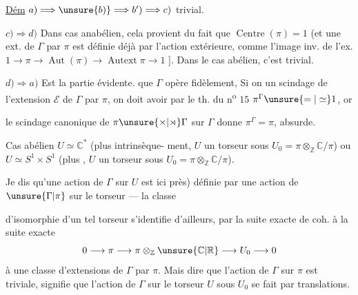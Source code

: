 \uline{Dém} $a)\Longrightarrow\unsure{b)}\Longrightarrow b')\Longrightarrow c)$ trivial.

$c)\Longrightarrow d)$ Dans cas anabélien, cela provient
du fait que $\operatorname{Centre}(\pi)=1$ (et une ext.
de $\Gamma$ par $\pi$ est définie déjà par l'action
extérieure,  comme l'image inv.
de l'ex. $1\longrightarrow\pi\longrightarrow\operatorname{Aut}(\pi)
\longrightarrow\operatorname{Autext}\pi\longrightarrow1$ ].
Dans le cas abélien, c'est trivial.

$d)\Longrightarrow a)$ Est la partie  évidente. 
  que $\Gamma$
opère fidèlement, 
 
Si on  un scindage de l'extension
$\mathcal E$ de $\Gamma$ par $\pi$, on doit avoir
par le th. du n\textsuperscript{o} $15$ $\pi^\Gamma\unsure{=|\simeq}1$, or

le scindage canonique de $\pi\unsure{\times|\rtimes}\Gamma$ sur $\Gamma$
donne $\pi^\Gamma=\pi$, absurde.

Cas abélien $U\simeq\mathbb C^*$ (plus intrinsèque-
ment, $U$ un torseur sous $U_0=\pi\otimes_{\mathbb Z}\mathbb C/\pi$)
ou $U\simeq S^1\times S^1$ (plus ,
$U$ un torseur sous $U_0=\pi\otimes_{\mathbb Z}\mathbb C/\pi$).

Je dis qu'une action de $\Gamma$ sur $U$ est
ici    près) définie par une action
de $\unsure{\Gamma|\pi}$ sur le torseur --- la classe



d'isomorphie d'un tel torseur s'identifie d'ailleurs, par la suite exacte de coh.  à la suite exacte
\[
0 \longrightarrow \pi \longrightarrow
\pi\otimes_{\mathbb Z}\unsure{\mathbb C|\mathbb R}
\longrightarrow U_0 \longrightarrow 0
\]
à une classe d'extensions de \(\Gamma\) par \(\pi\).
Mais dire que l'action de \(\Gamma\) sur \(\pi\) est triviale, signifie que l'action de \(\Gamma\) sur le torseur \(U\) sous \(U_0\) se fait par translations.


